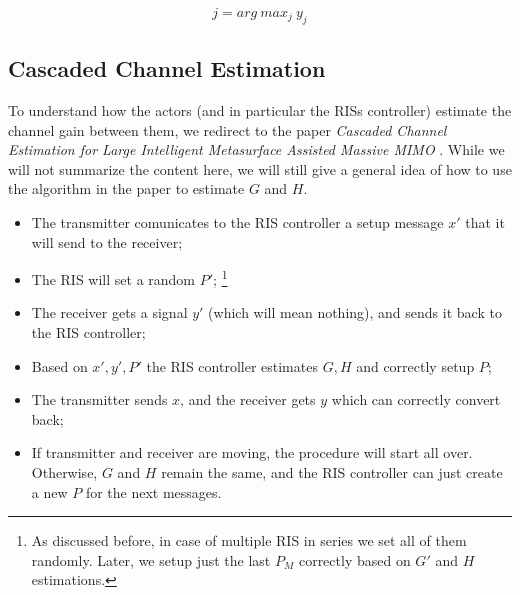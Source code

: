 \begin{equation}
  j = arg\ max_j\ y_j
\end{equation}

\subsection{Cascaded Channel Estimation}
To understand how the actors (and in particular the RISs controller) estimate the channel gain between them, we redirect to the paper \textit{Cascaded Channel Estimation for Large Intelligent Metasurface Assisted Massive MIMO} \cite{8879620}. While we will not summarize the content here, we will still give a general idea of how to use the algorithm in the paper to estimate $G$ and $H$.
\begin{itemize}
  \item The transmitter comunicates to the RIS controller a setup message $x'$ that it will send to the receiver;
  \item The RIS will set a random $P'$; \footnote{As discussed before, in case of multiple RIS in series we set all of them randomly. Later, we setup just the last $P_M$ correctly based on $G'$ and $H$ estimations.}
  \item The receiver gets a signal $y'$ (which will mean nothing), and sends it back to the RIS controller;
  \item Based on $x', y', P'$ the RIS controller estimates $G, H$ and correctly setup $P$;
  \item The transmitter sends $x$, and the receiver gets $y$ which can correctly convert back;
  \item If transmitter and receiver are moving, the procedure will start all over. Otherwise, $G$ and $H$ remain the same, and the RIS controller can just create a new $P$ for the next messages.
\end{itemize}